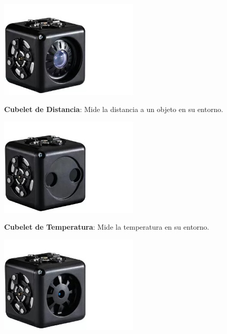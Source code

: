 \begin{itemize}
\begin{minipage}
        \end{minipage}
        \begin{minipage}
            {0.5\textwidth}
            \centering
            \includegraphics[width=0.5\textwidth]{./images/marco_teorico/cubelets/sensorDeLuz.png}
        \end{minipage}
        \begin{minipage}
            {0.5\textwidth}
            \item \textbf{Cubelet de Distancia}: Mide la distancia a un objeto en su entorno.
        \end{minipage}
        \begin{minipage}
            {0.5\textwidth}
            \centering
            \includegraphics[width=0.5\textwidth]{./images/marco_teorico/cubelets/sensorDeDistancia.png}
        \end{minipage}
        \begin{minipage}
            {0.5\textwidth}
            \item \textbf{Cubelet de Temperatura}: Mide la temperatura en su entorno.
        \end{minipage}
        \begin{minipage}
            {0.5\textwidth}
            \centering
            \includegraphics[width=0.5\textwidth]{./images/marco_teorico/cubelets/sensorDeTemperatura.png}

\end{minipage}
\end{itemize}
